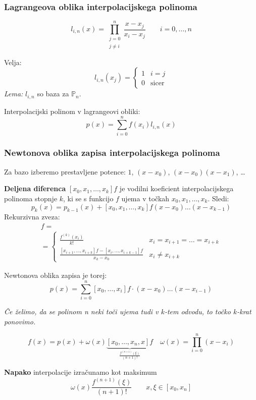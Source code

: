 \begin{multicols}{5}
\subsubsection*{Lagrangeova oblika interpolacijskega polinoma}
\[ l_{i, n}(x) = \prod_{\substack{j=0 \\ j\neq i}}^n \frac{x-x_j}{x_i - x_j} \qquad i = 0, \dots, n \]

Velja:
\[ 
l_{i,n}(x_j) = 
\begin{cases}
    1 & i = j \\
    0 & \text{sicer}
\end{cases}
\]
\textit{Lema:} $l_{i, n}$ so baza za $\mathbb{P}_n$.
%

Interpolacijski polinom v lagrangeovi obliki:
\[ p(x) = \sum_{i=0}^n f(x_i) l_{i,n}(x)\]

\subsubsection*{Newtonova oblika zapisa interpolacijskega polinoma}

Za bazo izberemo prestavljene potence: $1$, $(x-x_0)$, $(x-x_0)(x-x_1)$, \dots  


\textbf{Deljena diferenca} $[x_0, x_1, \dots, x_k] f$ je vodilni koeficient interpolacijskega polinoma
stopnje $k$, ki se s funkcijo $f$ ujema v točkah $x_0, x_1, \dots, x_k$. Sledi:
\[ p_k(x) = p_{k-1}(x) + [x_0, x_1, \dots, x_k] f (x-x_0)\dots (x-x_{k-1})\]
Rekurzivna zveza:
\begin{multline*}
    [x_i, x_{i+1}, \dots, x_{i+k}]f = \\
    = \begin{cases}
        \frac{f^{(k)}(x_i)}{k!} & {\scriptstyle x_i = x_{i+1} = \dots = x_{i+k}} \\
        \frac{[x_{i+1}, \dots, x_{i+k}]f- [x_i, \dots, x_{i+k-1}]f}{x_k-x_0} & {\scriptstyle x_i \neq x_{i+k} }
    \end{cases} 
\end{multline*} 

Newtonova oblika zapisa je torej:
\[ p(x) = \sum_{i=0}^n [x_0, \dots, x_i]f \cdot (x-x_0)\dots (x-x_{i-1}) \]

\textit{Če želimo, da se polinom n neki toči ujema tudi v $k$-tem odvodu, to točko $k$-krat ponovimo.}

\[ f(x) = p(x) + \omega(x) \underbrace{[x_0, \dots, x_n, x] f}_{\frac{f^{(n+1)}(\xi)}{(n+1)!}} \quad \omega(x) = \prod_{i=0}^n (x-x_i)\]

\textbf{Napako} interpolacije izračunamo kot maksimum
\[\omega(x) \frac{f^{(n+1)}(\xi)}{(n+1)!} \qquad x, \xi \in [x_0, x_n]\]


\end{multicols}
